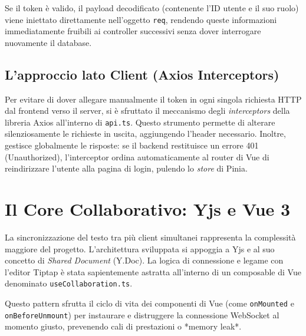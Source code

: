 \documentclass[11pt,a4paper]{report}
\begin{document}
Se il token è valido, il payload decodificato (contenente l'ID utente e il suo ruolo) viene iniettato direttamente nell'oggetto \texttt{req}, rendendo queste informazioni immediatamente fruibili ai controller successivi senza dover interrogare nuovamente il database.

\subsection{L'approccio lato Client (Axios Interceptors)}
Per evitare di dover allegare manualmente il token in ogni singola richiesta HTTP dal frontend verso il server, si è sfruttato il meccanismo degli \textit{interceptors} della libreria Axios all'interno di \texttt{api.ts}. Questo strumento permette di alterare silenziosamente le richieste in uscita, aggiungendo l'header necessario. Inoltre, gestisce globalmente le risposte: se il backend restituisce un errore 401 (Unauthorized), l'interceptor ordina automaticamente al router di Vue di reindirizzare l'utente alla pagina di login, pulendo lo \textit{store} di Pinia.

\section{Il Core Collaborativo: Yjs e Vue 3}
La sincronizzazione del testo tra più client simultanei rappresenta la complessità maggiore del progetto. L'architettura sviluppata si appoggia a Yjs e al suo concetto di \textit{Shared Document} (Y.Doc). La logica di connessione e legame con l'editor Tiptap è stata sapientemente astratta all'interno di un composable di Vue denominato \texttt{useCollaboration.ts}.

Questo pattern sfrutta il ciclo di vita dei componenti di Vue (come \texttt{onMounted} e \texttt{onBeforeUnmount}) per instaurare e distruggere la connessione WebSocket al momento giusto, prevenendo cali di prestazioni o *memory leak*.
\end{document}
